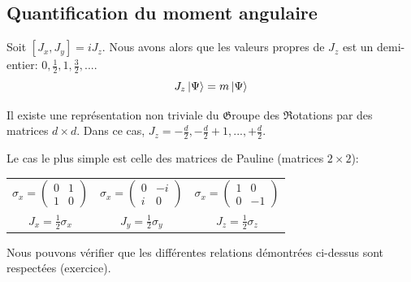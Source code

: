 \documentclass[../notesdecours.tex]{subfiles}
\begin{document}
\subsection{Quantification du moment angulaire}
\begin{theorem}
Soit $[J_x,J_y] = iJ_z$. Nous avons alors que les valeurs propres de $J_z$ est un demi-entier: $0,\frac{1}{2}, 1, \frac{3}{2}, ...$.
\begin{equation*}
J_z \ket{\Psi} = m\ket{\Psi}
\end{equation*}
\end{theorem}
\begin{theorem}
Il existe une représentation non triviale du $\mathfrak{G}$roupe des $\mathfrak{R}$otations par des matrices $d\times d$. Dans ce cas, $J_z = -\frac{d}{2}, -\frac{d}{2}+1,...,+\frac{d}{2}$.
\end{theorem}
\begin{exemple}
Le cas le plus simple est celle des matrices de Pauline (matrices $2\times 2$):
\begin{center}
\begin{tabular}{c|c|c}
$\sigma_x = \begin{pmatrix}
0 & 1\\
1 & 0
\end{pmatrix}$ & $\sigma_x = \begin{pmatrix}
0 & -i\\
i & 0
\end{pmatrix}$ & $\sigma_x = \begin{pmatrix}
1 & 0\\
0 & -1
\end{pmatrix}$\\
$J_x = \frac{1}{2}\sigma_x$ & $J_y = \frac{1}{2}\sigma_y$ & $J_z = \frac{1}{2}\sigma_z$
\end{tabular}
\end{center}
Nous pouvons vérifier que les différentes relations démontrées ci-dessus sont respectées (exercice).
\end{exemple}
\end{document}
